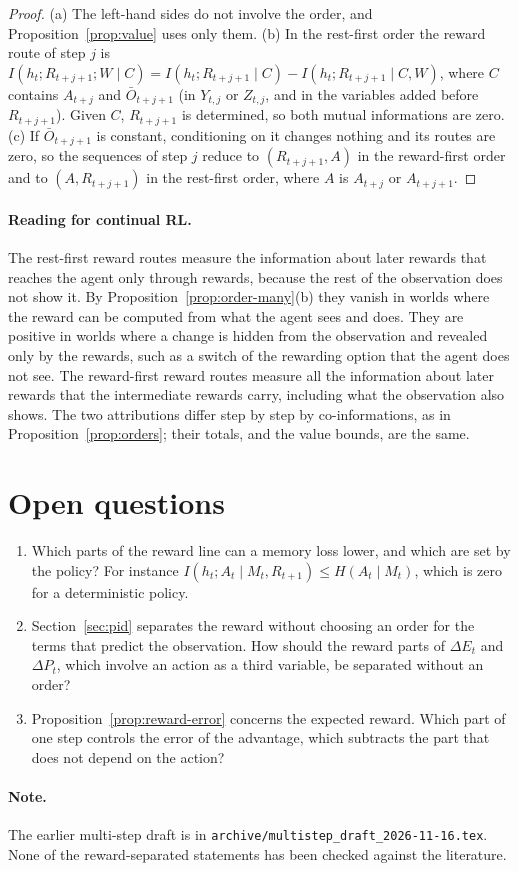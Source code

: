 \documentclass{article}
\theoremstyle{definition}
\theoremstyle{remark}
\newcommand{\dE}{\Delta E}
\newcommand{\dP}{\Delta P}
\newcommand{\Ob}{\bar O}
\begin{document}
\begin{proof}
(a) The left-hand sides do not involve the order, and Proposition~\ref{prop:value} uses only them. (b) In the rest-first order the reward route of step $j$ is $I(h_t;R_{t+j+1};W\mid C)=I(h_t;R_{t+j+1}\mid C)-I(h_t;R_{t+j+1}\mid C,W)$, where $C$ contains $A_{t+j}$ and $\Ob_{t+j+1}$ (in $Y_{t,j}$ or $Z_{t,j}$, and in the variables added before $R_{t+j+1}$). Given $C$, $R_{t+j+1}$ is determined, so both mutual informations are zero. (c) If $\Ob_{t+j+1}$ is constant, conditioning on it changes nothing and its routes are zero, so the sequences of step $j$ reduce to $(R_{t+j+1},A)$ in the reward-first order and to $(A,R_{t+j+1})$ in the rest-first order, where $A$ is $A_{t+j}$ or $A_{t+j+1}$.
\end{proof}

\paragraph{Reading for continual RL.}
The rest-first reward routes measure the information about later rewards that reaches the agent only through rewards, because the rest of the observation does not show it. By Proposition~\ref{prop:order-many}(b) they vanish in worlds where the reward can be computed from what the agent sees and does. They are positive in worlds where a change is hidden from the observation and revealed only by the rewards, such as a switch of the rewarding option that the agent does not see. The reward-first reward routes measure all the information about later rewards that the intermediate rewards carry, including what the observation also shows. The two attributions differ step by step by co-informations, as in Proposition~\ref{prop:orders}; their totals, and the value bounds, are the same.

\section{Open questions}

\begin{enumerate}
\item Which parts of the reward line can a memory loss lower, and which are set by the policy? For instance $I(h_t;A_t\mid M_t,R_{t+1})\le H(A_t\mid M_t)$, which is zero for a deterministic policy.
\item Section~\ref{sec:pid} separates the reward without choosing an order for the terms that predict the observation. How should the reward parts of $\dE_t$ and $\dP_t$, which involve an action as a third variable, be separated without an order?
\item Proposition~\ref{prop:reward-error} concerns the expected reward. Which part of one step controls the error of the advantage, which subtracts the part that does not depend on the action?
\end{enumerate}

\paragraph{Note.} The earlier multi-step draft is in \texttt{archive/multistep\_draft\_2026-11-16.tex}. None of the reward-separated statements has been checked against the literature.



\end{document}
